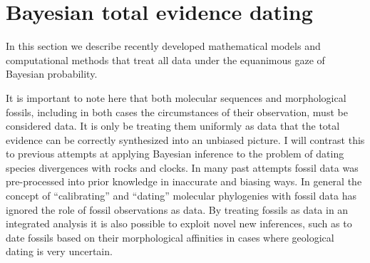\section{Bayesian total evidence dating}

In this section we describe recently developed mathematical models and computational methods that treat all data under the equanimous gaze of Bayesian probability. 

It is important to note here that both molecular sequences and morphological fossils, including in both cases the circumstances of their observation, must be considered data. It is only be treating them uniformly as data that the total evidence can be correctly synthesized into an unbiased picture. I will contrast this to previous attempts at applying Bayesian inference to the problem of dating species divergences with rocks and clocks. In many past attempts fossil data was pre-processed into prior knowledge in inaccurate and biasing ways. In general the concept of ``calibrating'' and ``dating'' molecular phylogenies with fossil data has ignored the role of fossil observations as data. By treating fossils as data in an integrated analysis it is also possible to exploit novel new inferences, such as to date fossils based on their morphological affinities in cases where geological dating is very uncertain.
